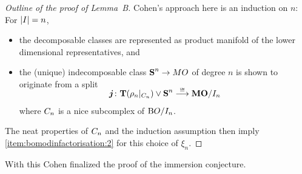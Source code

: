 \begin{proof}[Outline of the proof of Lemma~B]
  Cohen's approach here is an induction on $n$:
  For $\left|I\right|=n$,
  \begin{itemize}
  \item the decomposable classes are represented as product
    manifold of the lower dimensional representatives, and
  \item the (unique) indecomposable class $\bm{\mathrm{S}}^{n}\to MO$ of degree
    $n$ is shown to originate from a split
    \begin{gather*}
      \SwapAboveDisplaySkip
      \bm{j}\colon
      \Tspec{(\rho_n|_{\subcxBOmodI n})} \vee \Spherespec{n}
      \overset{\cong}\longrightarrow \MOmodI n
    \end{gather*}
    where $C_{n}$ is a nice subcomplex of $\mathrm{B}O/I_{n}$.
  \end{itemize}
  The neat properties of $C_{n}$ and the induction assumption
  then imply \ref{item:bomodinfactorisation:2} for this choice of
  $\xi_n$.
\end{proof}

With this Cohen finalized the proof of the immersion conjecture.



